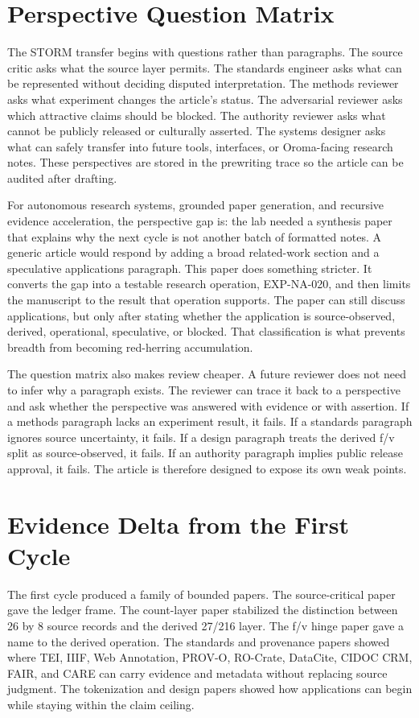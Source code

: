 \documentclass[sigconf,nonacm]{acmart}
\begin{document}
\section{Perspective Question Matrix}
The STORM transfer begins with questions rather than paragraphs. The source
critic asks what the source layer permits. The standards engineer asks what can
be represented without deciding disputed interpretation. The methods reviewer
asks what experiment changes the article's status. The adversarial reviewer asks
which attractive claims should be blocked. The authority reviewer asks what
cannot be publicly released or culturally asserted. The systems designer asks
what can safely transfer into future tools, interfaces, or Oroma-facing
research notes. These perspectives are stored in the prewriting trace so the
article can be audited after drafting.

For autonomous research systems, grounded paper generation, and recursive evidence acceleration, the perspective gap is: the lab needed a synthesis paper that explains why the next cycle is not another batch of formatted notes. A generic article would respond by
adding a broad related-work section and a speculative applications paragraph.
This paper does something stricter. It converts the gap into a testable
research operation, EXP-NA-020, and then limits the manuscript to the result
that operation supports. The paper can still discuss applications, but only
after stating whether the application is source-observed, derived, operational,
speculative, or blocked. That classification is what prevents breadth from
becoming red-herring accumulation.

The question matrix also makes review cheaper. A future reviewer does not need
to infer why a paragraph exists. The reviewer can trace it back to a perspective
and ask whether the perspective was answered with evidence or with assertion.
If a methods paragraph lacks an experiment result, it fails. If a standards
paragraph ignores source uncertainty, it fails. If a design paragraph treats the
derived f/v split as source-observed, it fails. If an authority paragraph implies
public release approval, it fails. The article is therefore designed to expose
its own weak points.

\section{Evidence Delta from the First Cycle}
The first cycle produced a family of bounded papers. The source-critical paper
gave the ledger frame. The count-layer paper stabilized the distinction between
26 by 8 source records and the derived 27/216 layer. The f/v hinge paper gave a
name to the derived operation. The standards and provenance papers showed where
TEI, IIIF, Web Annotation, PROV-O, RO-Crate, DataCite, CIDOC CRM, FAIR, and CARE
can carry evidence and metadata without replacing source judgment. The
tokenization and design papers showed how applications can begin while staying
within the claim ceiling.
\end{document}
